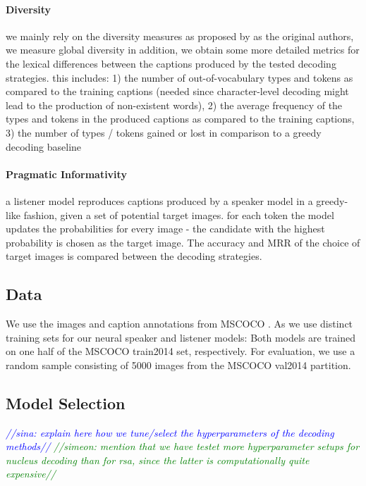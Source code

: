 \documentclass[11pt,a4paper]{article}
\newcommand{\sina}[1]{\textcolor{blue}{\emph{//sina: #1//}}}
\newcommand{\simeon}[1]{\textcolor{green}{\emph{//simeon: #1//}}}
\begin{document}
\paragraph{Diversity}
we mainly rely on the diversity measures as proposed by
\citet{van-miltenburg-etal-2018-measuring}
as the original authors, we measure global diversity
in addition, we obtain some more detailed metrics for the lexical differences between the captions produced by the tested decoding strategies. this includes: 1) the number of out-of-vocabulary types and tokens as compared to the training captions (needed since character-level decoding might lead to the production of non-existent words),  2) the average frequency of the types and tokens in the produced captions as compared to the training captions, 3) the number of types / tokens gained or lost in comparison to a greedy decoding baseline

\paragraph{Pragmatic Informativity} a listener model reproduces captions produced by a speaker model in a greedy-like fashion, given a set of potential target images. for each token the model updates the probabilities for every image - the candidate with the highest probability is chosen as the target image. The accuracy and MRR of the choice of target images is compared between the decoding strategies.

\subsection{Data}

We use the images and caption annotations from MSCOCO \citep{Lin2014}. As \citet{Cohn-Gordon2018} we use distinct training sets for our neural speaker and listener models: Both models are trained on one half of the MSCOCO train2014 set, respectively. For evaluation, we use a random sample consisting of 5000 images from the MSCOCO val2014 partition.

\subsection{Model Selection}
\label{subsec: model selection}
\sina{explain here how we tune/select the hyperparameters of the decoding methods}
\simeon{mention that we have testet more hyperparameter setups for nucleus decoding than for rsa, since the latter is computationally quite expensive}
\end{document}

